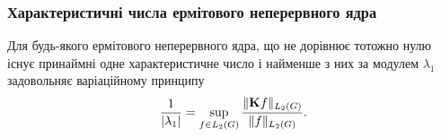 \subsubsection{Характеристичні числа ермітового неперервного ядра}

\begin{theorem}
	Для будь-якого ермітового неперервного ядра, що не дорівнює тотожно нулю існує принаймні одне характеристичне число і найменше з них за модулем $\lambda_1$ задовольняє варіаційному принципу
	\begin{equation}
		\dfrac{1}{|\lambda_1|} = \displaystyle\sup\limits_{f \in L_2(G)} \dfrac{\|\textbf{K} f\|_{L_2(G)}}{\|f\|_{L_2(G)}}.
	\end{equation}
\end{theorem}


